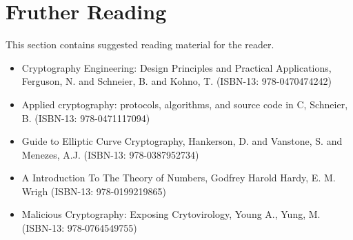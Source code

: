 \section{Fruther Reading}

This section contains suggested reading material for the reader.

\begin{itemize}
	\item Cryptography Engineering: Design Principles and Practical Applications, Ferguson, N. and Schneier, B. and Kohno, T. (ISBN-13: 978-0470474242)
	\item Applied cryptography: protocols, algorithms, and source code in C, Schneier, B. (ISBN-13: 978-0471117094)
	\item Guide to Elliptic Curve Cryptography, Hankerson, D. and Vanstone, S. and Menezes, A.J. (ISBN-13: 978-0387952734)
	\item A Introduction To The Theory of Numbers, Godfrey Harold Hardy, E. M. Wrigh (ISBN-13: 978-0199219865)
	\item Malicious Cryptography: Exposing Crytovirology, Young A., Yung, M. (ISBN-13: 978-0764549755)
\end{itemize}

